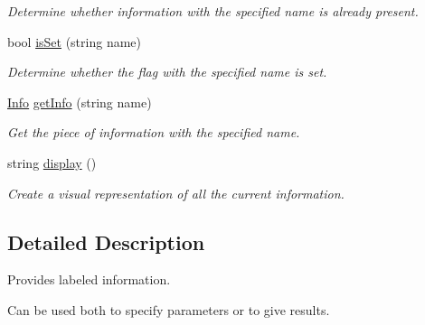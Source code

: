 \begin{DoxyCompactItemize}
\begin{DoxyCompactList}\small\item\em Determine whether information with the specified name is already present. \end{DoxyCompactList}\item 
\hypertarget{classpct_1_1_info_set_a10de2ed5cd357b1fe4c9b2cedd2f7622}{bool \hyperlink{classpct_1_1_info_set_a10de2ed5cd357b1fe4c9b2cedd2f7622}{is\-Set} (string name)}\label{classpct_1_1_info_set_a10de2ed5cd357b1fe4c9b2cedd2f7622}

\begin{DoxyCompactList}\small\item\em Determine whether the flag with the specified name is set. \end{DoxyCompactList}\item 
\hypertarget{classpct_1_1_info_set_a762e6aa4218fb0743bc6f3b25b1681d9}{\hyperlink{classpct_1_1_info}{Info} \hyperlink{classpct_1_1_info_set_a762e6aa4218fb0743bc6f3b25b1681d9}{get\-Info} (string name)}\label{classpct_1_1_info_set_a762e6aa4218fb0743bc6f3b25b1681d9}

\begin{DoxyCompactList}\small\item\em Get the piece of information with the specified name. \end{DoxyCompactList}\item 
\hypertarget{classpct_1_1_info_set_afb54aabd6af682f26d8f3288b15d5f23}{string \hyperlink{classpct_1_1_info_set_afb54aabd6af682f26d8f3288b15d5f23}{display} ()}\label{classpct_1_1_info_set_afb54aabd6af682f26d8f3288b15d5f23}

\begin{DoxyCompactList}\small\item\em Create a visual representation of all the current information. \end{DoxyCompactList}\end{DoxyCompactItemize}


\subsection{Detailed Description}
Provides labeled information. 

Can be used both to specify parameters or to give results. 


